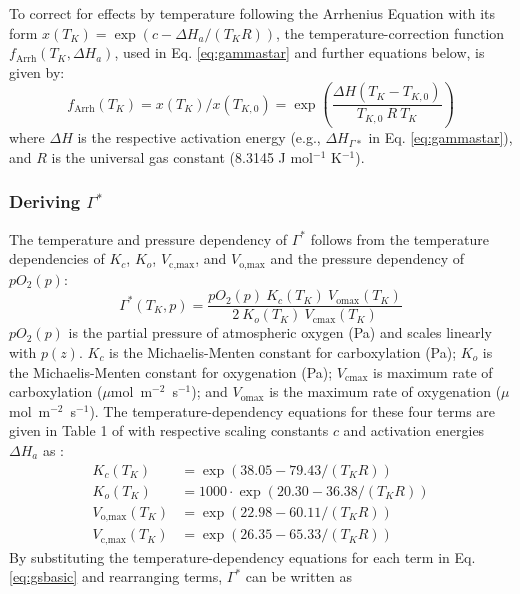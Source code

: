 \documentclass{myreport}
\begin{document}
To correct for effects by temperature following the Arrhenius Equation with its form $x(T_K)=\exp(c-\Delta H_a/(T_K R))$, the temperature-correction function $f_{\text{Arrh}}(T_K, \Delta H_a)$, used in Eq. \ref{eq:gammastar} and further equations below, is given by:
\begin{equation}
    f_{\text{Arrh}}(T_K) = x(T_K)/x(T_{K,0}) = \exp \left( \frac{\Delta H (T_K - T_{K,0})}{T_{K,0}\: R\: T_K} \right) 
\end{equation}
where $\Delta H$ is the respective activation energy (e.g., $\Delta H_{\Gamma\ast}$ in Eq. \ref{eq:gammastar}), and $R$ is the universal gas constant (8.3145 J mol$^{-1}$ K$^{-1}$).

\subsubsection{Deriving $\Gamma^\ast$}
The temperature and pressure dependency of $\Gamma^\ast$ follows from the temperature dependencies of $K_c$, $K_o$, $V_\text{c,max}$, and $V_\text{o,max}$ and the pressure dependency of $pO_2(p)$:
\begin{equation}
\label{eq:gsbasic}
    \Gamma^\ast (T_K, p) = \frac{pO_2(p)\: K_c(T_K)\: V_\text{omax}(T_K)}
                        {2\: K_o(T_K)\: V_\text{cmax}(T_K)}
\end{equation}
$pO_2(p)$ is the partial pressure of atmospheric oxygen (Pa) and scales linearly with $p(z)$. $K_c$ is the Michaelis-Menten constant for carboxylation (Pa); $K_o$ is the Michaelis-Menten constant for oxygenation (Pa); $V_\text{cmax}$ is maximum rate of carboxylation ($\mu$mol~m$^{-2}$~s$^{-1}$); and $V_\text{omax}$ is the maximum rate of oxygenation ($\mu$mol~m$^{-2}$~s$^{-1}$). The temperature-dependency equations for these four terms are given in Table 1 of \cite{bernacchi01} with respective scaling constants $c$ and activation energies $\Delta H_a$ as :
\begin{subequations}
\begin{align}
    K_c(T_K) &= \exp(38.05-79.43/(T_K R)) \\
    K_o(T_K) &= 1000 \cdot \exp(20.30-36.38/(T_K R)) \\
    V_\text{o,max}(T_K) &= \exp(22.98-60.11/(T_K R)) \\
    V_\text{c,max}(T_K) &= \exp(26.35-65.33/(T_K R))
\end{align}
\end{subequations}
By substituting the temperature-dependency equations for each term in Eq. \ref{eq:gsbasic} and rearranging terms, $\Gamma^\ast$ can be written as
\end{document}
